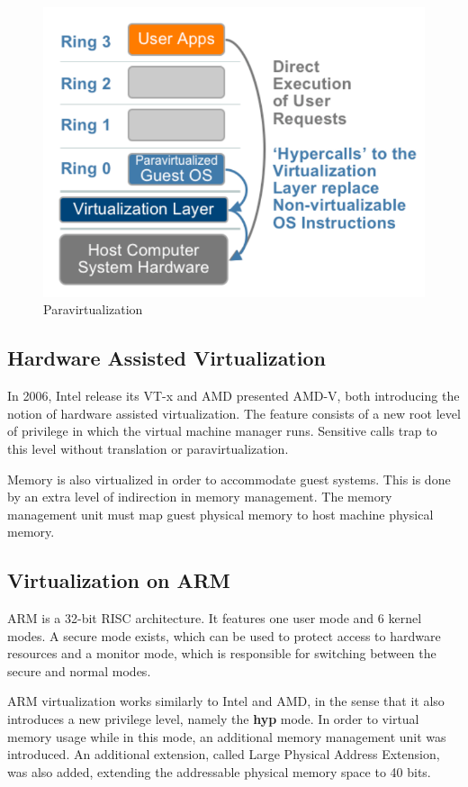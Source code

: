\begin{figure}[h]
\centering
  \includegraphics[width=.4\linewidth]{img/paravirt.png}
  \caption{Paravirtualization\cite{vmware}}
\end{figure}

\subsection{Hardware Assisted Virtualization}
\label{subsec:havirt}

In 2006, Intel release its VT-x and AMD presented AMD-V, both introducing the notion of hardware assisted virtualization. The feature consists of a new root level of privilege in which the virtual machine manager runs. Sensitive calls trap to this level without  translation or paravirtualization\cite{vmware}.

Memory is also virtualized in order to accommodate guest systems. This is done by an extra level of indirection in memory management. The memory management unit must map guest physical memory to host machine physical memory\cite{genode-arm}.

\subsection{Virtualization on ARM}
\label{subsec:armvirt}

ARM is a 32-bit RISC architecture. It features one user mode and 6 kernel modes. A secure mode exists, which can be used to protect access to hardware resources and a monitor mode, which is responsible for switching between the secure and normal modes\cite{hw-support-arm}.

ARM virtualization works similarly to Intel and AMD, in the sense that it also introduces a new privilege level, namely the \textbf{hyp} mode. In order to virtual memory usage while in this mode, an additional memory management unit was introduced. An additional extension, called Large Physical Address Extension, was also added, extending the addressable physical memory space to 40 bits\cite{genode-arm}.

